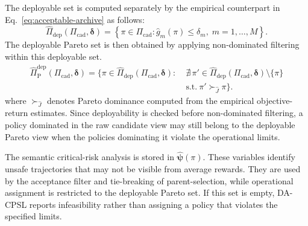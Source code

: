 \documentclass[sigconf,review,anonymous]{acmart}
\begin{document}
The deployable set is computed separately by the empirical counterpart in Eq.~\ref{eq:acceptable-archive} as follows:
\begin{equation}
\widehat{\Pi}_{\mathrm{dep}}
(\Pi_{\mathrm{cad}},\boldsymbol{\delta})
=
\left\{
\pi\in\Pi_{\mathrm{cad}}:
\widehat{g}_m(\pi)\leq \delta_m,
\; m=1,\ldots,M
\right\}.
\label{eq:empirical-deployable-set}
\end{equation}
The deployable Pareto set is then obtained by applying non-dominated filtering within this deployable set.
\begin{equation}
\begin{aligned}
\widehat{\Pi}_{\mathrm{P}}^{\mathrm{dep}}
(\Pi_{\mathrm{cad}},\boldsymbol{\delta})
=
\bigl\{
\pi\in
\widehat{\Pi}_{\mathrm{dep}}
(\Pi_{\mathrm{cad}},\boldsymbol{\delta})
:\;&
\nexists\,
\pi'\in
\widehat{\Pi}_{\mathrm{dep}}
(\Pi_{\mathrm{cad}},\boldsymbol{\delta})
\setminus\{\pi\}
\\
&\mathrm{s.t.}\
\pi'\succ_{\widehat{J}}\pi
\bigr\}.
\end{aligned}
\label{eq:empirical-deployable-pareto-set}
\end{equation}
where \(\succ_{\widehat{J}}\) denotes Pareto dominance computed from the
empirical objective-return estimates. Since deployability is checked
before non-dominated filtering, a policy dominated in the raw candidate
view may still belong to the deployable Pareto view when the policies
dominating it violate the operational limits.

The semantic critical-risk analysis is stored in \(\widehat{\boldsymbol{\psi}}(\pi)\).
These variables identify unsafe trajectories that may not be visible from average rewards.
They are used by the acceptance filter and tie-breaking of parent-selection, while operational assignment is restricted to the deployable Pareto set.
If this set is empty, DA-CPSL reports infeasibility rather than assigning a policy that violates the specified limits.
\end{document}
